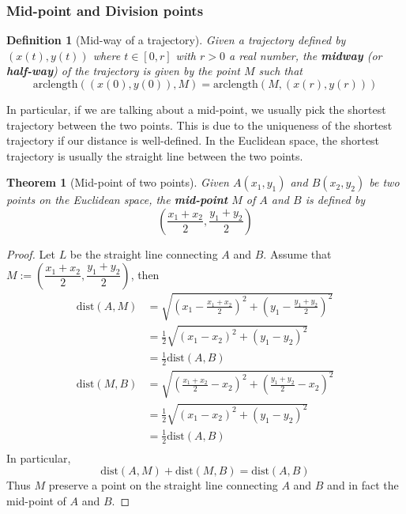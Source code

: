 \documentclass[12pt]{article}
\newtheorem{definition}{Definition}[section]
\newtheorem*{theorem}{Theorem}
\begin{document}
    \subsubsection*{Mid-point and Division points}

    \begin{definition}[Mid-way of a trajectory]
        Given a trajectory defined by $(x(t),y(t))$ where $t\in [0,r]$ with $r>0$ a real number, the \textbf{midway} (or \textbf{half-way}) of the trajectory is given by the point $M$ such that $$\mathrm{arclength}((x(0),y(0)),M)=\mathrm{arclength}(M,(x(r),y(r)))$$
    \end{definition}

    In particular, if we are talking about a mid-point, we usually pick the shortest trajectory between the two points. This is due to the uniqueness of the shortest trajectory if our distance is well-defined. In the Euclidean space, the shortest trajectory is usually the straight line between the two points.

    \begin{theorem}[Mid-point of two points]
        Given $A(x_1,y_1)$ and $B(x_2,y_2)$ be two points on the Euclidean space, the \textbf{mid-point} $M$ of $A$ and $B$ is defined by $$(\frac{x_1+x_2}{2},\frac{y_1+y_2}{2})$$
    \end{theorem}

    \begin{proof}
        Let $L$ be the straight line connecting $A$ and $B$. Assume that $M:=(\dfrac{x_1+x_2}{2},\dfrac{y_1+y_2}{2})$, then\begin{align*}
            \mathrm{dist}(A,M)&=\sqrt{(x_1-\frac{x_1+x_2}{2})^2+(y_1-\frac{y_1+y_2}{2})^2}\\
            &=\frac{1}{2}\sqrt{(x_1-x_2)^2+(y_1-y_2)^2}\\
            &=\frac{1}{2}\mathrm{dist}(A,B)\\
            \mathrm{dist}(M,B)&=\sqrt{(\frac{x_1+x_2}{2}-x_2)^2+(\frac{y_1+y_2}{2}-x_2)^2}\\
            &=\frac{1}{2}\sqrt{(x_1-x_2)^2+(y_1-y_2)^2}\\
            &=\frac{1}{2}\mathrm{dist}(A,B)\\
        \end{align*}
        In particular, $$\mathrm{dist}(A,M)+\mathrm{dist}(M,B)=\mathrm{dist}(A,B)$$
        Thus $M$ preserve a point on the straight line connecting $A$ and $B$ and in fact the mid-point of $A$ and $B$.
    \end{proof}
\end{document}
